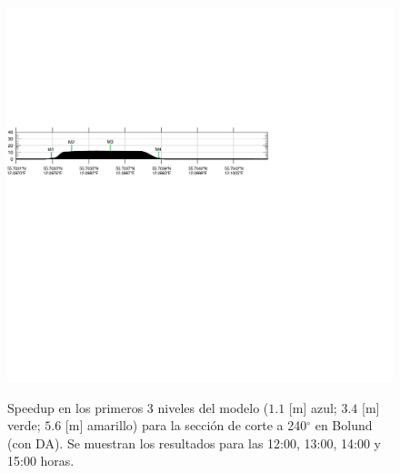 \begin{figure}[H]
	\includegraphics[width=0.95\linewidth,trim={-11mm 193mm 115mm 112mm},clip]{Imagenes/06/bol_da/cross_height}\\%
	\caption{Speedup en los primeros 3 niveles del modelo ($1.1$ [m] azul; $3.4$ [m] verde; $5.6$ [m] amarillo) para la sección de corte a 240$^\circ$ en Bolund (con DA). Se muestran los resultados para las 12:00, 13:00, 14:00 y 15:00 horas.}
	\label{fig:06_bol_da_speedup}
\end{figure}
\vspace*{\fill}
\newpage
\vspace*{\fill}
